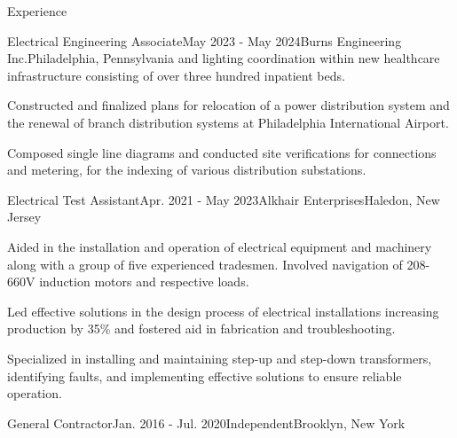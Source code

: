 \documentclass{resume}
\begin{document}
\begin{rSection}{Experience}
\begin{rSubsection}{Electrical Engineering Associate}{May 2023 - May 2024}{Burns Engineering Inc.}{Philadelphia, Pennsylvania}
                and lighting coordination within new healthcare infrastructure
                consisting of over three hundred inpatient beds.
            \item Constructed and finalized plans for relocation of a power
                distribution system and the renewal of branch distribution
                systems at Philadelphia International Airport.
            \item Composed single line diagrams and conducted site
                verifications for connections and metering, for the indexing of
                various distribution substations.
        \end{rSubsection}
        \begin{rSubsection}{Electrical Test Assistant}{Apr. 2021 - May 2023}{Alkhair Enterprises}{Haledon, New Jersey}
            \item Aided in the installation and operation of electrical
                equipment and machinery along with a group of five experienced
                tradesmen. Involved navigation of 208-660V induction motors and
                respective loads.
            \item Led effective solutions in the design process of electrical
                installations increasing production by 35\% and fostered aid in
                fabrication and troubleshooting.
            \item Specialized in installing and maintaining step-up and
                step-down transformers, identifying faults, and implementing
                effective solutions to ensure reliable operation.
        \end{rSubsection}
        \begin{rSubsection}{General Contractor}{Jan. 2016 - Jul. 2020}{Independent}{Brooklyn, New York}

\end{rSubsection}
\end{rSection}
\end{document}
